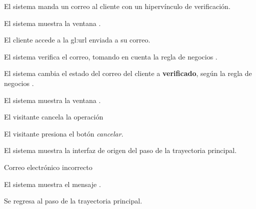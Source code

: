 {\begin{trayectoriaPrincipal}
      \item El sistema manda un correo al cliente con un hipervínculo de
        verificación.

      \item El sistema muestra la ventana
        .

      \item El cliente accede a la \gls{gl:url} enviada a su correo.

      \item El sistema verifica el correo, tomando en cuenta la regla de negocios
        .

      \item El sistema cambia el estado del correo del cliente a
        \textbf{verificado}, según la regla de negocios
        .

      \item El sistema muestra la ventana
        .

  \end{trayectoriaPrincipal}


  \begin{trayectoriaAlternativa}[ta:cancelar]
    {El visitante cancela la operación}

    \item El visitante presiona el botón \textit{cancelar}.

    \item El sistema muestra la interfaz de origen del paso
       de la trayectoria principal.

  \end{trayectoriaAlternativa}


  \begin{trayectoriaAlternativa}
    {Correo electrónico incorrecto}

    \item El sistema muestra el mensaje .

    \item Se regresa al paso  de la trayectoria
      principal.


\end{trayectoriaAlternativa}}
